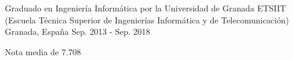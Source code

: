 

\begin{cventries}

  \cventry
    {Graduado en Ingeniería Informática por la Universidad de Granada} %
    {ETSIIT (Escuela Técnica Superior de Ingenierías Informática y de Telecomunicación)} %
    {Granada, España} %
    {Sep. 2013 - Sep. 2018} %
    {
      \begin{cvitems} %
        \item {Nota media de 7.708}
      \end{cvitems}
    }

\end{cventries}
